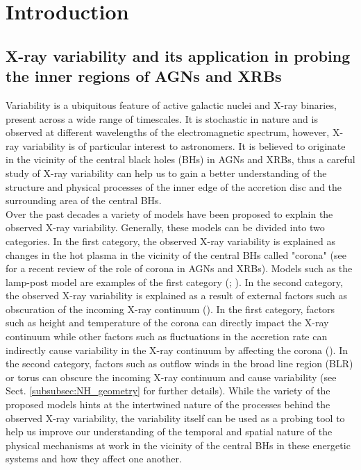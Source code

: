 \documentclass{aa}
\begin{document}

   \maketitle
%
\section{Introduction}
\label{sec:intro}
\subsection{X-ray variability and its application in probing the inner regions of AGNs and XRBs}
Variability is a ubiquitous feature of active galactic nuclei and X-ray binaries, present across a wide range of timescales. It is stochastic in nature and is observed at different wavelengths of the electromagnetic spectrum, however, X-ray variability is of particular interest to astronomers. It is believed to originate in the vicinity of the central black holes (BHs) in AGNs and XRBs, thus a careful study of X-ray variability can help us to gain a better understanding of the structure and physical processes of the inner edge of the accretion disc and the surrounding area of the central BHs. \\
Over the past decades a variety of models have been proposed to explain the observed X-ray variability. Generally, these models can be divided into two categories. In the first category, the observed X-ray variability is explained as changes in the hot plasma in the vicinity of the central BHs called "corona" (see \citealt{Laha2025} for a recent review of the role of corona in AGNs and XRBs). Models such as the lamp-post model are examples of the first category (\citealt{Gonzalez2016}; \citealt{Ursini2020}). In the second category, the observed X-ray variability is explained as a result of external factors such as obscuration of the incoming X-ray continuum (\citealt{Zhang2017}). In the first category, factors such as height and temperature of the corona can directly impact the X-ray continuum while other factors such as fluctuations in the accretion rate can indirectly cause variability in the X-ray continuum by affecting the corona (\citealt{Hagen2025}). In the second category, factors such as outflow winds in the broad line region (BLR) or torus can obscure the incoming X-ray continuum and cause variability (see Sect. \ref{subsubsec:NH_geometry} for further details). While the variety of the proposed models hints at the intertwined nature of the processes behind the observed X-ray variability, the variability itself can be used as a probing tool to help us improve our understanding of the temporal and spatial nature of the physical mechanisms at work in the vicinity of the central BHs in these energetic systems and how they affect one another. \\ 
\end{document}
